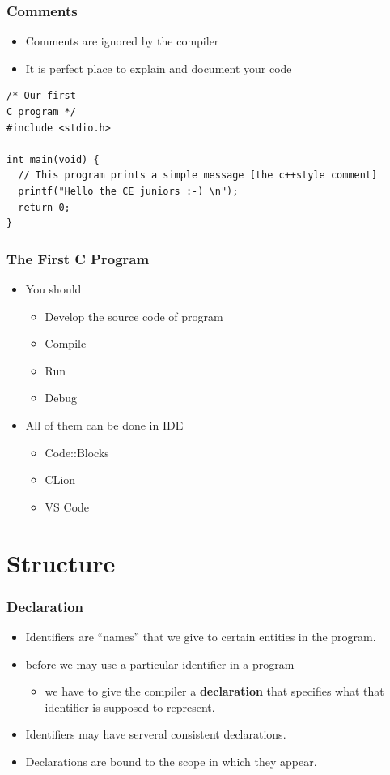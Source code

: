 \documentclass{../c-lecture}
\begin{document}
\begin{frame}[fragile]
  \frametitle{Comments}
  \begin{itemize}
    \item Comments are ignored by the compiler
    \item It is perfect place to explain and document your code
  \end{itemize}
  \begin{verbatim}
/* Our first
C program */
#include <stdio.h>

int main(void) {
  // This program prints a simple message [the c++style comment]
  printf("Hello the CE juniors :-) \n");
  return 0;
}
  \end{verbatim}
\end{frame}

\begin{frame}
  \frametitle{The First C Program}
  \begin{itemize}
    \item You should
    \begin{itemize}
      \item Develop the source code of program
      \item Compile
      \item Run
      \item Debug
    \end{itemize}
    \item All of them can be done in IDE
    \begin{itemize}
      \item Code::Blocks
      \item CLion
      \item VS Code
    \end{itemize}
  \end{itemize}
\end{frame}

\section{Structure}

\begin{frame}
  \frametitle{Declaration}
  \begin{itemize}
    \item Identifiers are ``names'' that we give to certain entities in the program.
    \item before we may use a particular identifier in a program
    \begin{itemize}
      \item we have to give the compiler a \textbf{\color{Peach} declaration} that specifies what that identifier is supposed to represent.
    \end{itemize}
    \item Identifiers may have serveral consistent declarations.
    \item Declarations are bound to the scope in which they appear.
  \end{itemize}
\end{frame}
\end{document}
